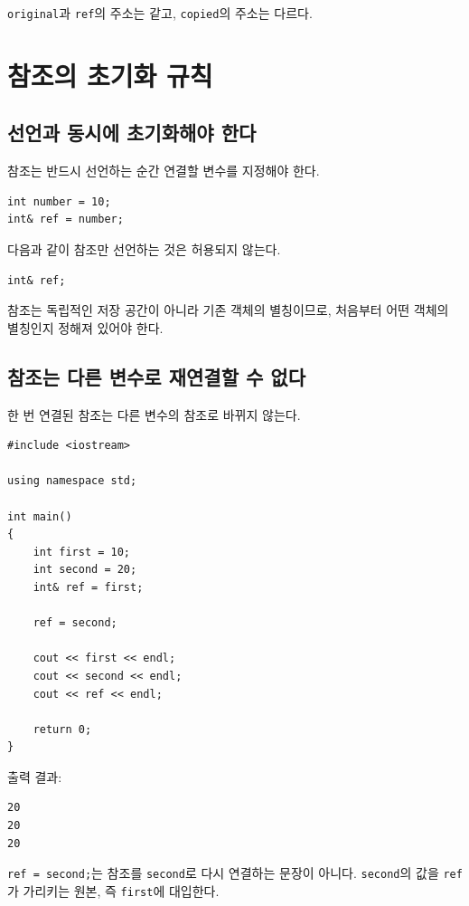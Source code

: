 \documentclass[11pt,a4paper]{article}
\begin{document}
\texttt{original}과 \texttt{ref}의 주소는 같고, \texttt{copied}의 주소는 다르다.

\section{참조의 초기화 규칙}

\subsection{선언과 동시에 초기화해야 한다}

참조는 반드시 선언하는 순간 연결할 변수를 지정해야 한다.

\begin{lstlisting}
int number = 10;
int& ref = number;
\end{lstlisting}

다음과 같이 참조만 선언하는 것은 허용되지 않는다.

\begin{lstlisting}
int& ref;
\end{lstlisting}

참조는 독립적인 저장 공간이 아니라 기존 객체의 별칭이므로, 처음부터 어떤 객체의 별칭인지 정해져 있어야 한다.

\subsection{참조는 다른 변수로 재연결할 수 없다}

한 번 연결된 참조는 다른 변수의 참조로 바뀌지 않는다.

\begin{lstlisting}
#include <iostream>

using namespace std;

int main()
{
    int first = 10;
    int second = 20;
    int& ref = first;

    ref = second;

    cout << first << endl;
    cout << second << endl;
    cout << ref << endl;

    return 0;
}
\end{lstlisting}

출력 결과:

\begin{verbatim}
20
20
20
\end{verbatim}

\texttt{ref = second;}는 참조를 \texttt{second}로 다시 연결하는 문장이 아니다.
\texttt{second}의 값을 \texttt{ref}가 가리키는 원본, 즉 \texttt{first}에 대입한다.
\end{document}
